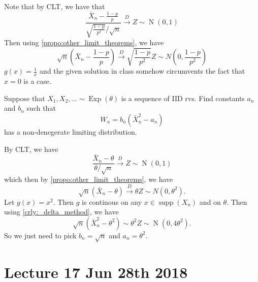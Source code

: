 \documentclass[notoc,notitlepage]{tufte-book}
\DeclareMathOperator{\Exp}{Exp }
\DeclareMathOperator{\Nor}{N }
\DeclareMathOperator{\supp}{supp }
\newcommand{\convd}{\overset{D}{\to}}
\begin{document}
\begin{solution}
  Note that by CLT, we have that
  \begin{equation*}
    \frac{\bar{X}_n - \frac{1 - p}{p}}{\sqrt{\frac{1 - p}{p^2}} / \sqrt{n}} \convd Z \sim \Nor(0, 1)
  \end{equation*}
  Then using \cref{propo:other_limit_theorems}, we have
  \begin{equation*}
    \sqrt{n} \left( \bar{X}_n - \frac{1 - p}{p} \right) \convd \sqrt{ \frac{1 - p}{p^2} } Z \sim N\left(0, \frac{1 - p}{p^2}\right)
  \end{equation*}
   $g(x) = \frac{1}{x}$ and the given solution in class somehow circumvents the fact that $x = 0$ is a case.
\end{solution}

\begin{eg}[Example 5.15]
  Suppose that $X_1, X_2,... \sim \Exp(\theta)$ is a sequence of IID rvs. Find constants $a_n$ and $b_n$ such that
  \begin{equation*}
    W_n = b_n (\bar{X}_n^2 - a_n)
  \end{equation*}
  has a non-denegerate limiting distribution.
\end{eg}

\begin{solution}
  By CLT, we have
  \begin{equation*}
    \frac{\bar{X}_n - \theta}{\theta / \sqrt{n}} \convd Z \sim \Nor(0, 1)
  \end{equation*}
  which then by \cref{propo:other_limit_theorems}, we have
  \begin{equation*}
    \sqrt{n} ( \bar{X}_n - \theta ) \convd \theta Z \sim N(0, \theta^2).
  \end{equation*}
  Let $g(x) = x^2$. Then $g$ is continous on any $x \in \supp(X_n)$ and on $\theta$. Then using \cref{crly:_delta_method}, we have
  \begin{equation*}
    \sqrt{n} ( \bar{X}_n^2 - \theta^2 ) \sim \theta^2 Z \sim \Nor(0, 4 \theta^2).
  \end{equation*}
  So we just need to pick $b_n = \sqrt{n}$ and $a_n = \theta^2$.
\end{solution}




\chapter{Lecture 17 Jun 28th 2018}%
\label{chp:lecture_17_jun_28th_2018}
\end{document}
